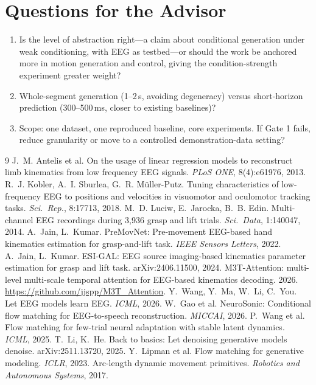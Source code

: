 \documentclass[11pt]{article}
\begin{document}
\section{Questions for the Advisor}

\begin{enumerate}
\item Is the level of abstraction right---a claim about conditional generation under weak conditioning, with EEG as testbed---or should the work be anchored more in motion generation and control, giving the condition-strength experiment greater weight?
\item Whole-segment generation (1--2\,s, avoiding degeneracy) versus short-horizon prediction (300--500\,ms, closer to existing baselines)?
\item Scope: one dataset, one reproduced baseline, core experiments. If Gate 1 fails, reduce granularity or move to a controlled demonstration-data setting?
\end{enumerate}

\begin{thebibliography}{9}\small
{} J.~M. Antelis et al. On the usage of linear regression models to reconstruct limb kinematics from low frequency EEG signals. \emph{PLoS ONE}, 8(4):e61976, 2013.
 R.~J. Kobler, A.~I. Sburlea, G.~R. M\"uller-Putz. Tuning characteristics of low-frequency EEG to positions and velocities in visuomotor and oculomotor tracking tasks. \emph{Sci.\ Rep.}, 8:17713, 2018.
 M.~D. Luciw, E.~Jarocka, B.~B. Edin. Multi-channel EEG recordings during 3,936 grasp and lift trials. \emph{Sci.\ Data}, 1:140047, 2014.
 A.~Jain, L.~Kumar. PreMovNet: Pre-movement EEG-based hand kinematics estimation for grasp-and-lift task. \emph{IEEE Sensors Letters}, 2022.
 A.~Jain, L.~Kumar. ESI-GAL: EEG source imaging-based kinematics parameter estimation for grasp and lift task. arXiv:2406.11500, 2024.
 M3T-Attention: multi-level multi-scale temporal attention for EEG-based kinematics decoding. 2026. \url{https://github.com/jjspp/M3T_Attention}.
 Y.~Wang, Y.~Ma, W.~Li, C.~You. Let EEG models learn EEG. \emph{ICML}, 2026.
 W.~Gao et al. NeuroSonic: Conditional flow matching for EEG-to-speech reconstruction. \emph{MICCAI}, 2026.
 P.~Wang et al. Flow matching for few-trial neural adaptation with stable latent dynamics. \emph{ICML}, 2025.
 T.~Li, K.~He. Back to basics: Let denoising generative models denoise. arXiv:2511.13720, 2025.
 Y.~Lipman et al. Flow matching for generative modeling. \emph{ICLR}, 2023.
 Arc-length dynamic movement primitives. \emph{Robotics and Autonomous Systems}, 2017.
\end{thebibliography}
\end{document}
